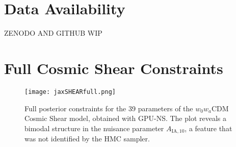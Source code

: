\documentclass[twocolumn]{openjournal}
\begin{document}
\section*{Data Availability}
ZENODO AND GITHUB WIP







\newpage
\appendix

\section{Full Cosmic Shear Constraints}

\begin{figure}[H]
    \centering
    \texttt{[image: jaxSHEARfull.png]}
    \caption{Full posterior constraints for the 39 parameters of the $w_0w_a$CDM Cosmic Shear model, obtained with GPU-NS. The plot reveals a bimodal structure in the nuisance parameter $A_{\text{IA},10}$, a feature that was not identified by the HMC sampler.}
    \label{shearfull}
\end{figure}
\end{document}
